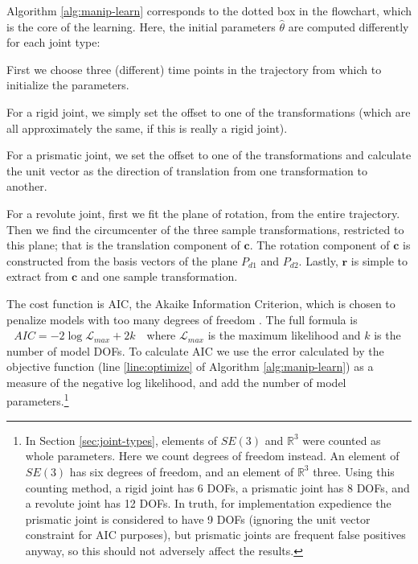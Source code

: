 \documentclass[a4paper,orivec]{llncs}
\def\xse{\bm}            \def\xsestr{in boldface}
\begin{document}
Algorithm \ref{alg:manip-learn} corresponds to the dotted box in the flowchart, which is the core of the learning. Here, the initial parameters $\hat{\theta}$ are computed differently for each joint type:
\begin{itemize*}
  \item First we choose three (different) time points in the trajectory from which to initialize the parameters.
  \item For a rigid joint, we simply set the offset to one of the transformations (which are all approximately the same, if this is really a rigid joint).
  \item For a prismatic joint, we set the offset to one of the transformations and calculate the unit vector as the direction of translation from one transformation to another.
  \item For a revolute joint, first we fit the plane of rotation, from the entire trajectory. Then we find the circumcenter of the three sample transformations, restricted to this plane; that is the translation component of $\xse{c}$. The rotation component of $\xse{c}$ is constructed from the basis vectors of the plane $P_{d1}$ and $P_{d2}$. Lastly, $\xse{r}$ is simple to extract from $\xse{c}$ and one sample transformation.
\end{itemize*}

The cost function is AIC, the Akaike Information Criterion, which is chosen to penalize models with too many degrees of freedom \cite{Liddle2008}. The full formula is
$~~~
  AIC = -2 \log \mathcal{L}_{max} + 2k
~~~$
where $\mathcal{L}_{max}$ is the maximum likelihood and $k$ is the number of model DOFs. To calculate AIC we use the error calculated by the objective function (line \ref{line:optimize} of Algorithm \ref{alg:manip-learn}) as a measure of the negative log likelihood, and add the number of model parameters.\footnote{In Section \ref{sec:joint-types}, elements of $SE(3)$ and $\mathbb{R}^3$ were counted as whole parameters. Here we count degrees of freedom instead. An element of $SE(3)$ has six degrees of freedom, and an element of $\mathbb{R}^3$ three. Using this counting method, a rigid joint has 6 DOFs, a prismatic joint has 8 DOFs, and a revolute joint has 12 DOFs. In truth, for implementation expedience the prismatic joint is considered to have 9 DOFs (ignoring the unit vector constraint for AIC purposes), but prismatic joints are frequent false positives anyway, so this should not adversely affect the results.}
\end{document}

